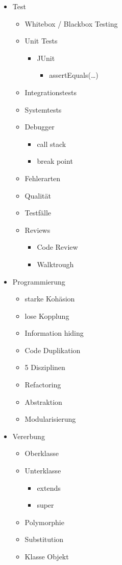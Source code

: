 \begin{itemize}
    \item Test
    \begin{itemize}
        \item Whitebox / Blackbox Testing
        \item Unit Tests
        \begin{itemize}
            \item JUnit
            \begin{itemize}
                \item assertEquals(\dots)
            \end{itemize}
        \end{itemize}
        \item Integrationstests
        \item Systemtests
        \item Debugger
        \begin{itemize}
            \item call stack
            \item break point
        \end{itemize}
        \item Fehlerarten
        \item Qualität
        \item Testfälle
        \item Reviews
        \begin{itemize}
            \item Code Review
            \item Walktrough
        \end{itemize}
    \end{itemize}
    
    \item Programmierung
    \begin{itemize}
        \item starke Kohäsion
        \item lose Kopplung
        \item Information hiding
        \item Code Duplikation
        \item 5 Disziplinen
        \item Refactoring
        \item Abstraktion
        \item Modularisierung
    \end{itemize}
    
    \item Vererbung
    \begin{itemize}
        \item Oberklasse
        \item Unterklasse
        \begin{itemize}
            \item extends
            \item super
        \end{itemize}
        \item Polymorphie
        \item Substitution
        \item Klasse Objekt
    \end{itemize}
    
\end{itemize}
